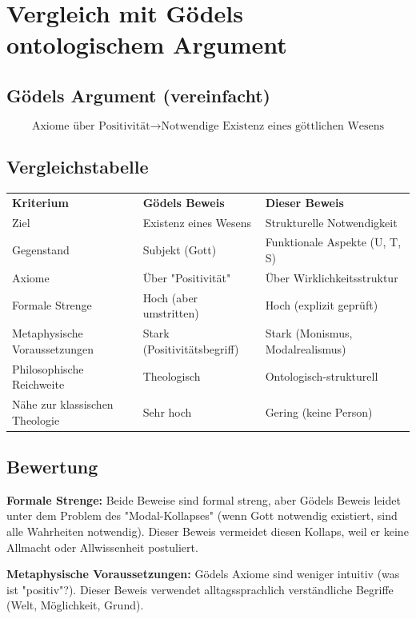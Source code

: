 \documentclass[
]{article}
\begin{document}
\section{Vergleich mit Gödels ontologischem Argument}\label{vergleich-mit-goumldels-ontologischem-argument}

\subsection{Gödels Argument (vereinfacht)}\label{goumldels-argument-vereinfacht}

\[
\text{Axiome über Positivität} \rightarrow \text{Notwendige Existenz eines göttlichen Wesens}
\]

\subsection{Vergleichstabelle}\label{vergleichstabelle}

\begin{tabular}{lll}
\textbf{Kriterium} & \textbf{Gödels Beweis} & \textbf{Dieser Beweis} \\
Ziel & Existenz eines Wesens & Strukturelle Notwendigkeit \\
Gegenstand & Subjekt (Gott) & Funktionale Aspekte (U, T, S) \\
Axiome & Über "Positivität" & Über Wirklichkeitsstruktur \\
Formale Strenge & Hoch (aber umstritten) & Hoch (explizit geprüft) \\
Metaphysische Voraussetzungen & Stark (Positivitätsbegriff) & Stark (Monismus, Modalrealismus) \\
Philosophische Reichweite & Theologisch & Ontologisch-strukturell \\
Nähe zur klassischen Theologie & Sehr hoch & Gering (keine Person) \\
\end{tabular}

\subsection{Bewertung}\label{bewertung}

\textbf{Formale Strenge:} Beide Beweise sind formal streng, aber Gödels Beweis leidet unter dem Problem des "Modal-Kollapses" (wenn Gott notwendig existiert, sind alle Wahrheiten notwendig). Dieser Beweis vermeidet diesen Kollaps, weil er keine Allmacht oder Allwissenheit postuliert.

\textbf{Metaphysische Voraussetzungen:} Gödels Axiome sind weniger intuitiv (was ist "positiv"?). Dieser Beweis verwendet alltagssprachlich verständliche Begriffe (Welt, Möglichkeit, Grund).
\end{document}
